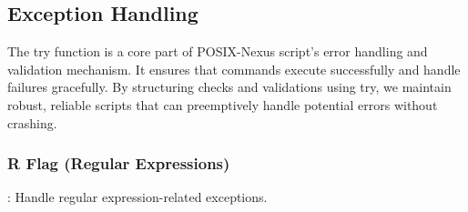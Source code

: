 \subsection{Exception Handling}
\label{sec:component:sub:exception}
The try function is a core part of POSIX-Nexus script's error handling and validation mechanism.
It ensures that commands execute successfully and handle failures gracefully.
By structuring checks and validations using try, we maintain robust, reliable scripts that can preemptively handle potential errors without crashing.

\subsubsection{R Flag (Regular Expressions)}
\label{sec:component:sub:exception:sub:R}
: Handle regular expression-related exceptions.
